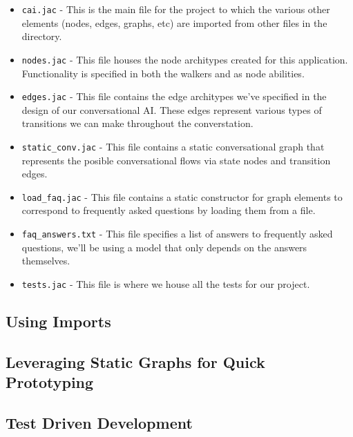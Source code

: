 \begin{itemize}
    \item \texttt{cai.jac} - This is the main file for the project to which the various other elements (nodes, edges, graphs, etc) are imported from other files in the directory.
    \item \texttt{nodes.jac} - This file houses the node architypes created for this application. Functionality is specified in both the walkers and as node abilities.
    \item \texttt{edges.jac} - This file contains the edge architypes we've specified in the design of our conversational AI. These edges represent various types of transitions we can make throughout the converstation.
    \item \texttt{static\_conv.jac} - This file contains a static conversational graph that represents the posible conversational flows via state nodes and transition edges.
    \item \texttt{load\_faq.jac} - This file contains a static constructor for graph elements to correspond to frequently asked questions by loading them from a file.
    \item \texttt{faq\_answers.txt} - This file specifies a list of answers to frequently asked questions, we'll be using a model that only depends on the answers themselves.
    \item \texttt{tests.jac} - This file is where we house all the tests for our project.
\end{itemize}

\subsection{Using Imports}




\subsection{Leveraging Static Graphs for Quick Prototyping}

\subsection{Test Driven Development}

